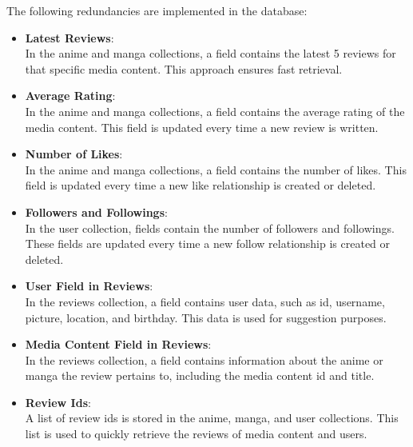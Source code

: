 \vspace{\baselineskip}

The following redundancies are implemented in the database:

\vspace{\baselineskip}

\begin{itemize}
    \item \textbf{Latest Reviews}: \\
    In the anime and manga collections, a field contains the latest 5 reviews for that specific media content. This approach ensures fast retrieval.

    \vspace{\baselineskip}

    \item \textbf{Average Rating}: \\
    In the anime and manga collections, a field contains the average rating of the media content. This field is updated every time a new review is written.

    \vspace{\baselineskip}

    \item \textbf{Number of Likes}: \\
    In the anime and manga collections, a field contains the number of likes. This field is updated every time a new like relationship is created or deleted.

    \vspace{\baselineskip}

    \item \textbf{Followers and Followings}: \\ 
    In the user collection, fields contain the number of followers and followings. These fields are updated every time a new follow relationship is created or deleted.

    \vspace{\baselineskip}

    \item \textbf{User Field in Reviews}: \\
    In the reviews collection, a field contains user data, such as id, username, picture, location, and birthday. This data is used for suggestion purposes.

    \vspace{\baselineskip}

    \item \textbf{Media Content Field in Reviews}: \\
    In the reviews collection, a field contains information about the anime or manga the review pertains to, including the media content id and title.

    \vspace{\baselineskip}

    \item \textbf{Review Ids}: \\
    A list of review ids is stored in the anime, manga, and user collections. This list is used to quickly retrieve the reviews of media content and users.
\end{itemize}

